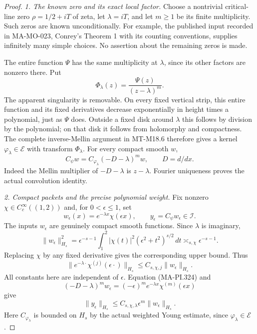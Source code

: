 \begin{proof}
\emph{1. The known zero and its exact local factor.}
Choose a nontrivial critical-line zero
\(\rho=1/2+iT\) of zeta, let \(\lambda=iT\), and
let \(m\ge1\) be its finite multiplicity.  Such zeros
are known unconditionally.  For example, the
published input recorded in MA-MO-023, Conrey's
Theorem 1 with its counting conventions, supplies
infinitely many simple choices.  No assertion about
the remaining zeros is made.

The entire function \(\Psi\) has the same multiplicity
at \(\lambda\), since its other factors are nonzero
there.  Put
\[
       \Phi_\lambda(z)=\frac{\Psi(z)}{(z-\lambda)^m}.
 \tag{MA-PI.323}
\]
The apparent singularity is removable.
On every fixed vertical strip, this entire function
and its fixed derivatives decrease exponentially in
height times a polynomial, just as \(\Psi\) does.
Outside a fixed disk around \(\lambda\) this follows
by division by the polynomial; on that disk it
follows from holomorphy and compactness.
The complete inverse-Mellin argument in MT-M18.6
therefore gives a kernel \(\varphi_\lambda\in\mathcal E\)
with transform \(\Phi_\lambda\).
For every compact smooth \(w\),
\[
 C_\psi w
   =C_{\varphi_\lambda}(-D-\lambda)^m w,
                       \qquad D=d/dx.
 \tag{MA-PI.324}
\]
Indeed the Mellin multiplier of \(-D-\lambda\)
is \(z-\lambda\).  Fourier uniqueness proves
the actual convolution identity.

\emph{2. Compact packets and the precise polynomial weight.}
Fix nonzero \(\chi\in C_c^\infty((1,2))\) and,
for \(0<\epsilon\le1\), set
\[
 w_\epsilon(x)=e^{-\lambda x}\chi(\epsilon x),
       \qquad y_\epsilon=C_\psi w_\epsilon\in\mathscr I.
 \tag{MA-PI.325}
\]
The inputs \(w_\epsilon\) are genuinely compact
smooth functions.  Since \(\lambda\) is imaginary,
\[
 \|w_\epsilon\|_{H_s}^2
   =\epsilon^{-s-1}
       \int_1^2|\chi(t)|^2(\epsilon^2+t^2)^{s/2}\,dt
   \asymp_{s,\chi}\epsilon^{-s-1}.
 \tag{MA-PI.326}
\]
Replacing \(\chi\) by any fixed derivative gives
the corresponding upper bound.  Thus
\[
 \|e^{-\lambda\cdot}\chi^{(j)}(\epsilon\cdot)\|_{H_s}
             \le C_{s,\chi,j}\|w_\epsilon\|_{H_s}.
 \tag{MA-PI.327}
\]
All constants here are independent of \(\epsilon\).
Equation (MA-PI.324) and
\[
 (-D-\lambda)^m w_\epsilon
       =(-\epsilon)^m e^{-\lambda x}
                              \chi^{(m)}(\epsilon x)
 \tag{MA-PI.328}
\]
give
\[
          \|y_\epsilon\|_{H_s}
              \le C_{s,\chi,\lambda}\epsilon^m
                                      \|w_\epsilon\|_{H_s}.
 \tag{MA-PI.329}
\]
Here \(C_{\varphi_\lambda}\) is bounded on \(H_s\)
by the actual weighted Young estimate, since
\(\varphi_\lambda\in\mathcal E\).


\end{proof}
